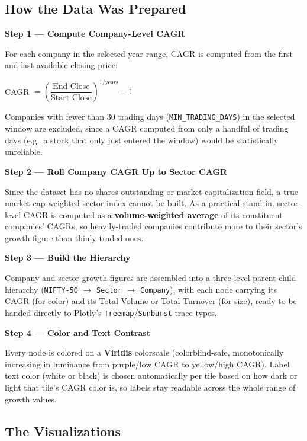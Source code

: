 \documentclass[14pt,a4paper]{extreport}
\begin{document}
\subsection{How the Data Was Prepared}

\noindent\textbf{Step 1 --- Compute Company-Level CAGR}

For each company in the selected year range, CAGR is computed from the
first and last available closing price:

\begin{center}
CAGR $= \left(\dfrac{\text{End Close}}{\text{Start Close}}\right)^{1/\text{years}} - 1$
\end{center}

Companies with fewer than 30 trading days (\texttt{MIN\_TRADING\_DAYS})
in the selected window are excluded, since a CAGR computed from only a
handful of trading days (e.g.\ a stock that only just entered the
window) would be statistically unreliable.

\noindent\textbf{Step 2 --- Roll Company CAGR Up to Sector CAGR}

Since the dataset has no shares-outstanding or market-capitalization
field, a true market-cap-weighted sector index cannot be built. As a
practical stand-in, sector-level CAGR is computed as a
\textbf{volume-weighted average} of its constituent companies' CAGRs, so
heavily-traded companies contribute more to their sector's growth figure
than thinly-traded ones.

\noindent\textbf{Step 3 --- Build the Hierarchy}

Company and sector growth figures are assembled into a three-level
parent-child hierarchy (\texttt{NIFTY-50} $\rightarrow$ \texttt{Sector}
$\rightarrow$ \texttt{Company}), with each node carrying its CAGR (for
color) and its Total Volume or Total Turnover (for size), ready to be
handed directly to Plotly's \texttt{Treemap}/\texttt{Sunburst} trace
types.

\noindent\textbf{Step 4 --- Color and Text Contrast}

Every node is colored on a \textbf{Viridis} colorscale (colorblind-safe,
monotonically increasing in luminance from purple/low CAGR to
yellow/high CAGR). Label text color (white or black) is chosen
automatically per tile based on how dark or light that tile's CAGR color
is, so labels stay readable across the whole range of growth values.

\subsection{The Visualizations}
\end{document}
